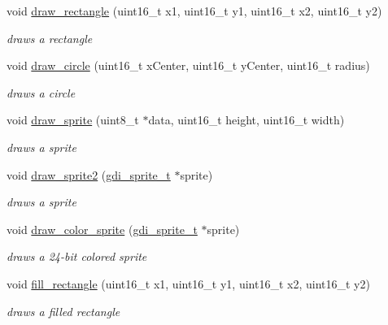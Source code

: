 \begin{CompactItemize}
void \hyperlink{group__hgdi__api_gfa36c7551052447e34f346143af702db}{draw\_\-rectangle} (uint16\_\-t x1, uint16\_\-t y1, uint16\_\-t x2, uint16\_\-t y2)
\begin{CompactList}\small\item\em draws a rectangle \item\end{CompactList}\item 
void \hyperlink{group__hgdi__api_gd2f97e49f85d6c4126e325042fcf0135}{draw\_\-circle} (uint16\_\-t xCenter, uint16\_\-t yCenter, uint16\_\-t radius)
\begin{CompactList}\small\item\em draws a circle \item\end{CompactList}\item 
void \hyperlink{group__hgdi__api_g4d61525496e856403881088f723791c8}{draw\_\-sprite} (uint8\_\-t $\ast$data, uint16\_\-t height, uint16\_\-t width)
\begin{CompactList}\small\item\em draws a sprite \item\end{CompactList}\item 
void \hyperlink{group__hgdi__api_ge78bbfb934b7a4443bdebd86508c246b}{draw\_\-sprite2} (\hyperlink{struct__gdi__sprite}{gdi\_\-sprite\_\-t} $\ast$sprite)
\begin{CompactList}\small\item\em draws a sprite \item\end{CompactList}\item 
void \hyperlink{group__hgdi__api_g39f639f5516f6a0fea13f7ffb39d2dcb}{draw\_\-color\_\-sprite} (\hyperlink{struct__gdi__sprite}{gdi\_\-sprite\_\-t} $\ast$sprite)
\begin{CompactList}\small\item\em draws a 24-bit colored sprite \item\end{CompactList}\item 
void \hyperlink{group__hgdi__api_g7aff5f3016a84ac9cfd360744d653700}{fill\_\-rectangle} (uint16\_\-t x1, uint16\_\-t y1, uint16\_\-t x2, uint16\_\-t y2)
\begin{CompactList}\small\item\em draws a filled rectangle \item\end{CompactList}\item 

\end{CompactItemize}
